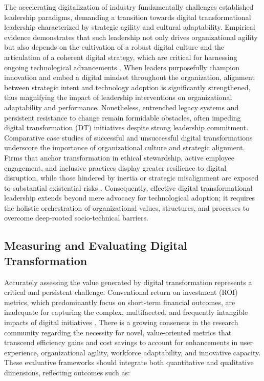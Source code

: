 The accelerating digitalization of industry fundamentally challenges established leadership paradigms, demanding a transition towards digital transformational leadership characterized by strategic agility and cultural adaptability. Empirical evidence demonstrates that such leadership not only drives organizational agility but also depends on the cultivation of a robust digital culture and the articulation of a coherent digital strategy, which are critical for harnessing ongoing technological advancements \cite{ref93}. When leaders purposefully champion innovation and embed a digital mindset throughout the organization, alignment between strategic intent and technology adoption is significantly strengthened, thus magnifying the impact of leadership interventions on organizational adaptability and performance. Nonetheless, entrenched legacy systems and persistent resistance to change remain formidable obstacles, often impeding digital transformation (DT) initiatives despite strong leadership commitment. Comparative case studies of successful and unsuccessful digital transformations underscore the importance of organizational culture and strategic alignment. Firms that anchor transformation in ethical stewardship, active employee engagement, and inclusive practices display greater resilience to digital disruption, while those hindered by inertia or strategic misalignment are exposed to substantial existential risks \cite{ref93}. Consequently, effective digital transformational leadership extends beyond mere advocacy for technological adoption; it requires the holistic orchestration of organizational values, structures, and processes to overcome deep-rooted socio-technical barriers.

\subsection{Measuring and Evaluating Digital Transformation}

Accurately assessing the value generated by digital transformation represents a critical and persistent challenge. Conventional return on investment (ROI) metrics, which predominantly focus on short-term financial outcomes, are inadequate for capturing the complex, multifaceted, and frequently intangible impacts of digital initiatives \cite{ref94}. There is a growing consensus in the research community regarding the necessity for novel, value-oriented metrics that transcend efficiency gains and cost savings to account for enhancements in user experience, organizational agility, workforce adaptability, and innovative capacity. These evaluative frameworks should integrate both quantitative and qualitative dimensions, reflecting outcomes such as:

